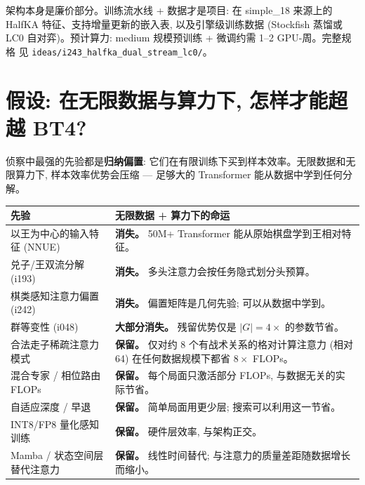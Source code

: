 \documentclass[10pt,a4paper]{article}
\begin{document}
\begin{tcolorbox}[callout, title=状态: 仅为提议]
架构本身是廉价部分。训练流水线 + 数据才是项目: 在 simple\_18 来源上的
HalfKA 特征、支持增量更新的嵌入表, 以及引擎级训练数据 (Stockfish 蒸馏或
LC0 自对弈)。预计算力: medium 规模预训练 + 微调约需 1--2 GPU-周。完整规格
见 \texttt{ideas/i243\_halfka\_dual\_stream\_lc0/}。
\end{tcolorbox}

\clearpage
\section{假设: 在无限数据与算力下, 怎样才能超越 BT4?}

侦察中最强的先验都是\textbf{归纳偏置}: 它们在有限训练下买到样本效率。无限数据和无限算力下, 样本效率优势会压缩 --- 足够大的 Transformer 能从数据中学到任何分解。

\begin{tcolorbox}[goodcallout, title=哪些优势保留? 哪些消失?]
\begin{footnotesize}
\begin{tabularx}{\linewidth}{@{}p{6cm} L@{}}
\toprule
\textbf{先验} & \textbf{无限数据 + 算力下的命运} \\
\midrule
以王为中心的输入特征 (NNUE) & \textbf{消失。} 50M+ Transformer 能从原始棋盘学到王相对特征。 \\
兑子/王双流分解 (i193) & \textbf{消失。} 多头注意力会按任务隐式划分头预算。 \\
棋类感知注意力偏置 (i242) & \textbf{消失。} 偏置矩阵是几何先验; 可以从数据中学到。 \\
群等变性 (i048) & \textbf{大部分消失。} 残留优势仅是 $|G|=4\times$ 的参数节省。 \\
\midrule
合法走子稀疏注意力模式 & \textbf{保留。} 仅对约 8 个有战术关系的格对计算注意力 (相对 64) 在任何数据规模下都省 $8\times$ FLOPs。 \\
混合专家 / 相位路由 FLOPs & \textbf{保留。} 每个局面只激活部分 FLOPs, 与数据无关的实际节省。 \\
自适应深度 / 早退 & \textbf{保留。} 简单局面用更少层; 搜索可以利用这一节省。 \\
INT8/FP8 量化感知训练 & \textbf{保留。} 硬件层效率, 与架构正交。 \\
Mamba / 状态空间层替代注意力 & \textbf{保留。} 线性时间替代; 与注意力的质量差距随数据增长而缩小。 \\
\bottomrule
\end{tabularx}
\end{footnotesize}
\end{tcolorbox}
\end{document}
